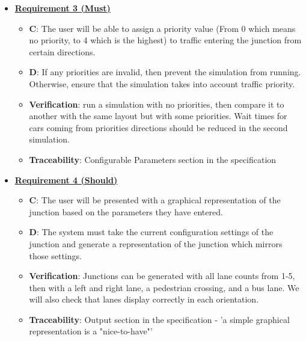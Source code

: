 \documentclass{article}
\begin{document}
\begin{itemize}
    \item \textbf{\underline{Requirement 3 (Must)}}
    \begin{itemize}
        \item \textbf{C}: The user will be able to assign a priority value (From 0 which means 
            no priority, to 4 which is the highest) to traffic entering the junction from certain 
            directions. 
        \item \textbf{D}: If any priorities are invalid, then prevent the simulation from running. 
            Otherwise, ensure that the simulation takes into account traffic priority.
        \item \textbf{Verification}: run a simulation with no priorities, then compare it to another 
            with the same layout but with some priorities. Wait times for cars coming from priorities 
            directions should be reduced in the second simulation.
        \item\textbf{Traceability}: Configurable Parameters section in the specification
    \end{itemize}

    \item \textbf{\underline{Requirement 4 (Should)}}
    \begin{itemize}
        \item \textbf{C}: The user will be presented with a graphical representation of the junction 
        based on the parameters they have entered.
        \item \textbf{D}: The system must take the current configuration settings of the junction and 
        generate a representation of the junction which mirrors those settings. 
        \item \textbf{Verification}: Junctions can be generated with all lane counts from 1-5, then 
        with a left and right lane, a pedestrian crossing, and a bus lane. We will also check that 
        lanes display correctly in each orientation.
        \item\textbf{Traceability}: Output section in the specification - 'a simple graphical 
        representation is a "nice-to-have"'
    \end{itemize}


\end{itemize}
\end{document}
